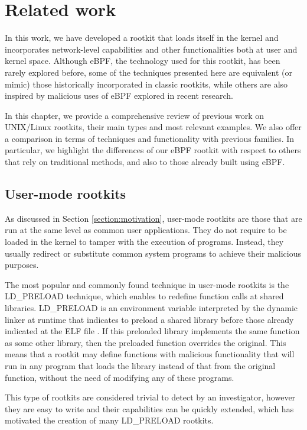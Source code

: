 \chapter{Related work} \label{chapter:related_work}
In this work, we have developed a rootkit that loads itself in the kernel
and incorporates network-level capabilities and other functionalities both
at user and kernel space. Although eBPF, the technology used for this
rootkit, has been rarely explored before, some of the techniques presented
here are equivalent (or mimic) those historically incorporated in classic
rootkits, while others are also inspired by malicious uses of eBPF explored
in recent research.

In this chapter, we provide a comprehensive review of previous
work on UNIX/Linux rootkits, their main types and most relevant examples.
We also offer a comparison in terms of techniques and functionality with
previous families. In particular, we highlight the differences of our
eBPF rootkit with respect to others that rely on traditional methods,
and also to those already built using eBPF.

\section{User-mode rootkits}
As discussed in Section \ref{section:motivation}, user-mode rootkits
are those that are run at the same level as common user applications. They
do not require to be loaded in the kernel to tamper with the execution of
programs. Instead, they usually redirect or substitute common system
programs to achieve their malicious purposes.

The most popular and commonly found technique in user-mode rootkits is the
LD\_PRELOAD technique, which enables to redefine function calls at shared
libraries. LD\_PRELOAD is an environment variable interpreted by the
dynamic linker at runtime that indicates to preload a shared library
before those already indicated at the ELF file \cite{ldpreload_pros}. If
this preloaded library implements the same function as some other library,
then the preloaded function overrides the original. This means that a
rootkit may define functions with malicious functionality that will run in
any program that loads the library instead of that from the original
function, without the need of modifying any of these programs.

This type of rootkits are considered trivial to detect by an investigator,
however they are easy to write and their capabilities can be quickly
extended, which has motivated the creation of many LD\_PRELOAD rootkits.

